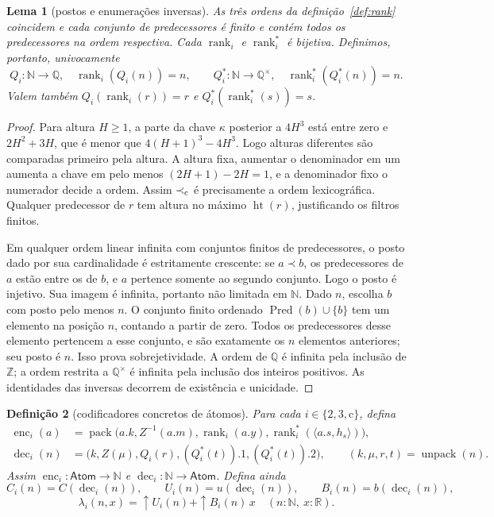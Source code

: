 \documentclass[11pt,a4paper]{article}
\newtheorem{definicao}{Definição}[section]
\newtheorem{lema}[definicao]{Lema}
\newcommand{\N}{\mathbb N}
\newcommand{\Z}{\mathbb Z}
\newcommand{\Q}{\mathbb Q}
\newcommand{\R}{\mathbb R}
\newcommand{\Atoms}{\mathsf{Atom}}
\newcommand{\htq}{\operatorname{ht}}
\newcommand{\dec}{\operatorname{dec}}
\newcommand{\enc}{\operatorname{enc}}
\newcommand{\pred}{\operatorname{Pred}}
\newcommand{\rankq}{\operatorname{rank}}
\newcommand{\qstar}{\Q^{\times}}
\begin{document}
\begin{lema}[postos e enumerações inversas]\label{lem:rank}
As três ordens da definição~\ref{def:rank} coincidem e cada conjunto
de predecessores é finito e contém todos os predecessores na ordem
respectiva. Cada $\rankq_i$ e $\rankq_i^*$ é bijetiva.
Definimos, portanto, univocamente
\[
 Q_i:\N\to\Q,\quad\rankq_i(Q_i(n))=n,
 \qquad Q_i^*:\N\to\qstar,\quad\rankq_i^*(Q_i^*(n))=n.
\]
Valem também $Q_i(\rankq_i(r))=r$ e
$Q_i^*(\rankq_i^*(s))=s$.
\end{lema}
\begin{proof}
Para altura $H\ge1$, a parte da chave $\kappa$ posterior a $4H^3$
está entre zero e $2H^2+3H$, que é menor que
$4(H+1)^3-4H^3$. Logo alturas diferentes são comparadas primeiro
pela altura. A altura fixa, aumentar o denominador em um aumenta
a chave em pelo menos $(2H+1)-2H=1$, e a denominador fixo o
numerador decide a ordem. Assim $\prec_{\rm c}$ é precisamente a
ordem lexicográfica. Qualquer predecessor de $r$ tem altura no
máximo $\htq(r)$, justificando os filtros finitos.

Em qualquer ordem linear infinita com conjuntos finitos de
predecessores, o posto dado por sua cardinalidade é estritamente
crescente: se $a\prec b$, os predecessores de $a$ estão entre os de
$b$, e $a$ pertence somente ao segundo conjunto. Logo o posto é
injetivo. Sua imagem é infinita, portanto não limitada em $\N$.
Dado $n$, escolha $b$ com posto pelo menos $n$. O conjunto finito
ordenado $\pred(b)\cup\{b\}$ tem um elemento na posição $n$,
contando a partir de zero. Todos os predecessores desse elemento
pertencem a esse conjunto, e são exatamente os $n$ elementos
anteriores; seu posto é $n$. Isso prova sobrejetividade.
A ordem de $\Q$ é infinita pela inclusão de $\Z$; a ordem restrita a
$\qstar$ é infinita pela inclusão dos inteiros positivos.
As identidades das inversas decorrem de existência e unicidade.
\end{proof}

\begin{definicao}[codificadores concretos de átomos]\label{def:codec}
Para cada $i\in\{2,3,\mathrm c\}$, defina
\begin{align*}
 \enc_i(a)&=\operatorname{pack}
    \bigl(a.k,Z^{-1}(a.m),\rankq_i(a.y),
                     \rankq_i^*(\langle a.s,h_s\rangle)\bigr),\\
 \dec_i(n)&=
 \bigl(k,Z(\mu),Q_i(r),(Q_i^*(t)).1,(Q_i^*(t)).2\bigr),
 \qquad (k,\mu,r,t)=\operatorname{unpack}(n).
\end{align*}
Assim $\enc_i:\Atoms\to\N$ e $\dec_i:\N\to\Atoms$.
Defina ainda
\[
 C_i(n)=C(\dec_i(n)),\qquad
 U_i(n)=u(\dec_i(n)),\qquad B_i(n)=b(\dec_i(n)),
\]
\[
 \lambda_i(n,x)=\uparrow U_i(n)+\uparrow B_i(n)\,x
 \quad(n:\N,\ x:\R).
\]
\end{definicao}
\end{document}
